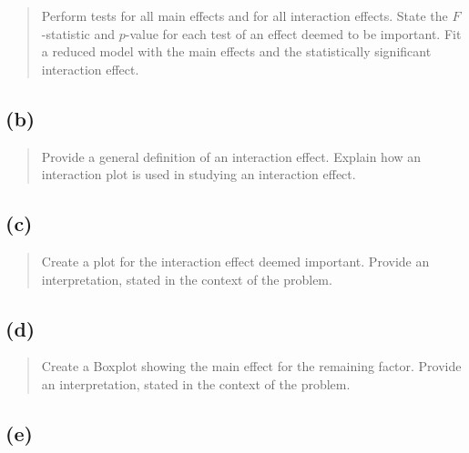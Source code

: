 \documentclass[
]{article}
\begin{document}
\begin{quote}
Perform tests for all main effects and for all interaction effects.
State the \(F\)-statistic and \(p\)-value for each test of an effect
deemed to be important. Fit a reduced model with the main effects and
the statistically significant interaction effect.
\end{quote}

\vspace{50pt}

\hypertarget{b-2}{%
\subsection{(b)}\label{b-2}}

\begin{quote}
Provide a general definition of an interaction effect. Explain how an
interaction plot is used in studying an interaction effect.
\end{quote}

\vspace{50pt}

\hypertarget{c-2}{%
\subsection{(c)}\label{c-2}}

\begin{quote}
Create a plot for the interaction effect deemed important. Provide an
interpretation, stated in the context of the problem.
\end{quote}

\vspace{50pt}

\hypertarget{d-2}{%
\subsection{(d)}\label{d-2}}

\begin{quote}
Create a Boxplot showing the main effect for the remaining factor.
Provide an interpretation, stated in the context of the problem.
\end{quote}

\vspace{50pt}

\hypertarget{e-2}{%
\subsection{(e)}\label{e-2}}
\end{document}
